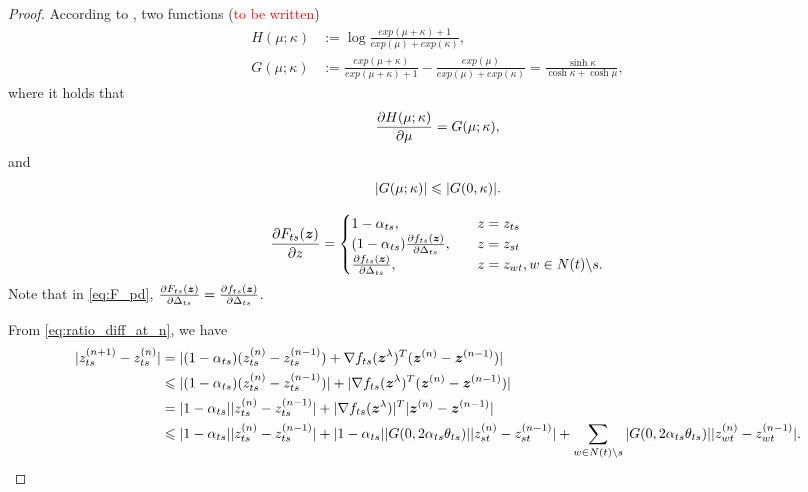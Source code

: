 \documentclass[conference,onecolumn]{IEEEtran}
\begin{document}
\begin{proof}
  According to \cite{roosta2008reweighed_sum_product}, two functions (\textcolor{red}{to be written})
  \begin{align}
    H(\mu; \kappa) &:= \log \frac{exp(\mu + \kappa) +1}{exp(\mu) + exp(\kappa)}, \nonumber \\
    G(\mu; \kappa) &:= \frac{exp(\mu + \kappa)}{exp(\mu + \kappa) + 1} - \frac{exp(\mu)}{exp(\mu) + exp(\kappa)} = \frac{\sinh{\kappa}}{\cosh{\kappa} + \cosh{\mu}},
  \end{align}
  where it holds that
  \begin{equation}
    \frac{ \partial H(\mu; \kappa)}{\partial \mu} = G(\mu; \kappa),
  \end{equation}
  and
  \begin{equation}
    | G(\mu; \kappa) | \leqslant | G(0, \kappa) |.
  \end{equation}

  \begin{equation}\label{eq:F_pd}
    \frac{ \partial F_{ts}(\bm{z})}{\partial z}=
    \begin{cases}
      1 - \alpha_{ts}, &\quad z = z_{ts}  \\
      ( 1 - \alpha_{ts}) \frac{ \partial f_{ts}(\bm{z})}{\partial \Delta_{ts}}, &\quad z = z_{st} \\
      \frac{ \partial f_{ts}(\bm{z})}{\partial \Delta_{ts}}, &\quad z = z_{wt}, w\in N(t)\backslash s.
    \end{cases}
  \end{equation}
  Note that in \eqref{eq:F_pd}, $\frac{ \partial F_{ts}(\bm{z})}{\partial \Delta_{ts}} = \frac{ \partial f_{ts}(\bm{z})}{\partial \Delta_{ts}}$.

  From \eqref{eq:ratio_diff_at_n}, we have
  \begin{align}\label{eq:ratio_cvg_step}
    | z_{ts}^{(n+1)} - z_{ts}^{(n)} | & = | (1-\alpha_{ts}) (z_{ts}^{(n)} - z_{ts}^{(n-1)}) + \nabla f_{ts}(\bm{z}^{\lambda})^{T} (\bm{z}^{(n)} - \bm{z}^{(n-1)}) | \nonumber \\
                                        & \leqslant | (1-\alpha_{ts}) (z_{ts}^{(n)} - z_{ts}^{(n-1)}) | + | \nabla f_{ts}(\bm{z}^{\lambda})^{T} (\bm{z}^{(n)} - \bm{z}^{(n-1)}) | \nonumber \\
                                        & = |  1 - \alpha_{ts} | | z_{ts}^{(n)} - z_{ts}^{(n-1)} | + | \nabla f_{ts}(\bm{z}^{\lambda}) |^{T} | \bm{z}^{(n)} - \bm{z}^{(n-1)} | \nonumber \\
                                        & \leqslant |  1 - \alpha_{ts} | | z_{ts}^{(n)} - z_{ts}^{(n-1)} | + |  1 - \alpha_{ts} | | G(0, 2 \alpha_{ts} \theta_{ts}) | | z_{st}^{(n)} - z_{st}^{(n-1)} | + \sum_{w\in N(t)\backslash s} | G(0, 2 \alpha_{ts} \theta_{ts}) | | z_{wt}^{(n)} - z_{wt}^{(n-1)} |.
  \end{align}


\end{proof}
\end{document}
